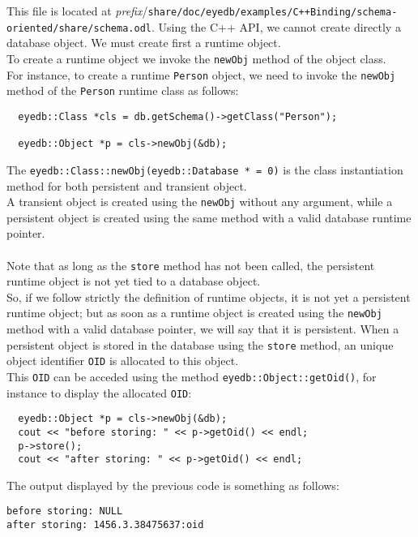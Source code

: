 \normalsize
This file is located at \emph{prefix}/\texttt{share/doc/eyedb/examples/C++Binding/schema-oriented/share/schema.odl}.
Using the C++ API, we cannot create directly a database object.
We must create first a runtime object.
\\
To create a runtime object we invoke the \texttt{newObj} method
of the object class.
\\
For instance, to create a runtime \texttt{Person} object, we need
to invoke the \texttt{newObj} method of the \texttt{Person} runtime class
as follows:
\verbsize
\begin{verbatim}
  eyedb::Class *cls = db.getSchema()->getClass("Person");

  eyedb::Object *p = cls->newObj(&db);
\end{verbatim}
\normalsize
The \texttt{eyedb::Class::newObj(eyedb::Database * = 0)} is the class instantiation
method for both persistent and transient object.
\\
A transient object is created using the \texttt{newObj} without any argument,
while a persistent object is created using the same method with
a valid database runtime pointer.
\\
\\
Note that as long as the \texttt{store} method has not been called,
the persistent runtime object is not yet tied to a database object.
\\
So, if we follow strictly the definition of runtime objects,
it is not yet a persistent runtime object; but as soon as a runtime
object is created using the \texttt{newObj} method with a valid database
pointer, we will say that it is persistent.
When a persistent object is stored in the database using the
\texttt{store} method, an unique object identifier \texttt{OID} is allocated
to this object.
\\
This \texttt{OID} can be acceded using the method \texttt{eyedb::Object::getOid()},
for instance to display the allocated \texttt{OID}:
\verbsize
\begin{verbatim}
  eyedb::Object *p = cls->newObj(&db);
  cout << "before storing: " << p->getOid() << endl;
  p->store();
  cout << "after storing: " << p->getOid() << endl;
\end{verbatim}
\normalsize
The output displayed by the previous code is something as follows:
\verbsize
\begin{verbatim}
before storing: NULL
after storing: 1456.3.38475637:oid
\end{verbatim}
